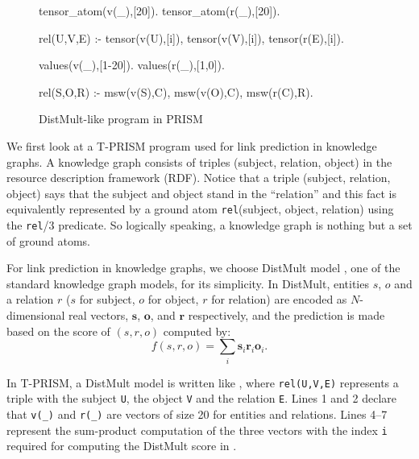 \documentclass[a4paper]{report}
\newcommand{\mvec}[1]{\mathbf{#1}}
\begin{document}
\begin{figure}[tb]
	\begin{minipage}[t]{0.49\hsize}
\begin{prologcode}[numbers=left]
tensor_atom(v(_),[20]).
tensor_atom(r(_),[20]).

rel(U,V,E) :-
    tensor(v(U),[i]),
    tensor(v(V),[i]),
    tensor(r(E),[i]).
\end{prologcode}
		\caption{DistMult program in T-PRISM}
		\label{fig:tprism-distmult}
	\end{minipage}
	\hfill
	\begin{minipage}[t]{0.49\hsize}
\begin{prologcode}[numbers=left]
values(v(_),[1-20]).
values(r(_),[1,0]).

rel(S,O,R) :-        %
    msw(v(S),C),     %
    msw(v(O),C),     %
    msw(r(C),R).     %
\end{prologcode}
		\caption{DistMult-like program in PRISM}
		\label{fig:prism-distmult}
	\end{minipage}
\end{figure}

We  first look  at  a  T-PRISM program  used  for  link prediction  in
knowledge  graphs.  A  knowledge graph  consists of  triples (subject,
relation, object) in the resource description framework (RDF).  Notice
that a  triple (subject, relation,  object) says that the  subject and
object  stand  in  the  ``relation'' and  this  fact  is  equivalently
represented  by a  ground atom  {\tt rel}(subject,  object, relation)
using the {\tt  rel}/3 predicate.  So logically  speaking, a knowledge
graph is nothing but a set of ground atoms.

For  link   prediction  in   knowledge  graphs,  we   choose  DistMult
model \cite{Yang15}, one  of the standard knowledge  graph models, for
its simplicity.  In DistMult, entities $s$, $o$ and a relation $r$ ($s$ for subject,
$o$ for  object, $r$ for  relation) are encoded as  $N$-dimensional real
vectors, $\mvec{s}$, $\mvec{o}$, and  $\mvec{r}$ respectively, and the
prediction is made based on the score of $(s,r,o)$ computed by:
%
\begin{equation}
f(s,r,o)=\sum_i \mvec{s}_i \mvec{r}_i \mvec{o}_i.
\label{eq:distmult}
\end{equation}

In T-PRISM, a DistMult model is written like
, where {\tt rel(U,V,E)} represents a
triple with the subject {\tt U}, the object {\tt V} and the relation {\tt E}.
Lines 1 and 2 declare that {\tt v(\_)} and {\tt r(\_)} are vectors of size 20
for entities and relations.  Lines 4--7 represent the sum-product
computation of the three vectors with the index {\tt i} required for
computing the DistMult score in .
\end{document}
